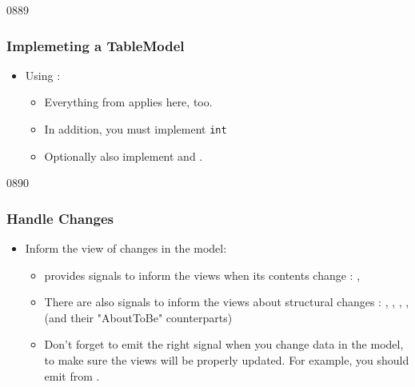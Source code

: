 \begin{slide}{0889}\frametitle{Implemeting a TableModel}
\begin{itemize}
\item Using :
  \begin{itemize}
  \item Everything from  applies here, too.
  \item In addition, you must implement \texttt{int} 
  \item Optionally also implement  and
    .
  \end{itemize}
\end{itemize}
\end{slide}

\begin{slide}{0890}\frametitle{Handle Changes}
\begin{itemize}
\item Inform the view of changes in the model:
  \begin{itemize}
  \item {} provides signals to inform the views when its contents change :
    ,  
  \item There are also signals to inform the views about structural changes :
    , ,
    , 
    , 
    (and their "AboutToBe" counterparts)
  \item Don't forget to emit the right signal when you change data in the model,
    to make sure the views will be properly updated. For example, you should emit
     from .
  \end{itemize}
\end{itemize}
\end{slide}

